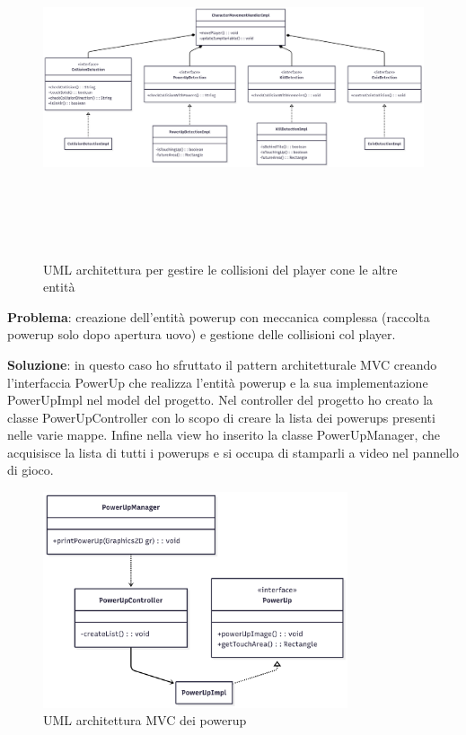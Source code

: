 \documentclass[a4paper,12pt]{report}
\begin{document}
\begin{figure}
    \centering
    \includegraphics[width=\textwidth, height=10cm]{resources/Collisions.png}
    \caption{UML architettura per gestire le collisioni del player cone le altre entità}
    \label{fig:2.3}
\end{figure}

\textbf{Problema}: creazione dell'entità powerup con meccanica complessa (raccolta powerup solo dopo apertura uovo) e gestione 
delle collisioni col player.

\textbf{Soluzione}: in questo caso ho sfruttato il pattern architetturale MVC creando l'interfaccia PowerUp che realizza l'entità powerup 
e la sua implementazione PowerUpImpl nel model del progetto. Nel controller del progetto ho creato la classe PowerUpController 
con lo scopo di creare la lista dei powerups presenti nelle varie mappe. Infine nella view ho inserito la classe PowerUpManager, 
che acquisisce la lista di tutti i powerups e si occupa di stamparli a video nel pannello di gioco.

\begin{figure}
    \centering
    \includegraphics[width=0.8\textwidth]{resources/Powerup.png}
    \caption{UML architettura MVC dei powerup}
    \label{fig:2.4}
\end{figure}
\end{document}
